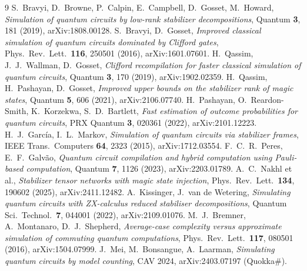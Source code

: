 \documentclass[11pt]{article}
\begin{document}
\begin{thebibliography}{9}
 S.~Bravyi, D.~Browne, P.~Calpin, E.~Campbell, D.~Gosset,
M.~Howard, \emph{Simulation of quantum circuits by low-rank stabilizer
decompositions}, Quantum \textbf{3}, 181 (2019), arXiv:1808.00128.
 S.~Bravyi, D.~Gosset, \emph{Improved classical simulation
of quantum circuits dominated by Clifford gates}, Phys.\ Rev.\ Lett.\
\textbf{116}, 250501 (2016), arXiv:1601.07601.
 H.~Qassim, J.~J.~Wallman, D.~Gosset, \emph{Clifford
recompilation for faster classical simulation of quantum circuits}, Quantum
\textbf{3}, 170 (2019), arXiv:1902.02359.
 H.~Qassim, H.~Pashayan, D.~Gosset, \emph{Improved upper
bounds on the stabilizer rank of magic states}, Quantum \textbf{5}, 606
(2021), arXiv:2106.07740.
 H.~Pashayan, O.~Reardon-Smith, K.~Korzekwa,
S.~D.~Bartlett, \emph{Fast estimation of outcome probabilities for quantum
circuits}, PRX Quantum \textbf{3}, 020361 (2022), arXiv:2101.12223.
\bibitem{garcia2015} H.~J.~Garc\'ia, I.~L.~Markov, \emph{Simulation of quantum
circuits via stabilizer frames}, IEEE Trans.\ Computers \textbf{64}, 2323
(2015), arXiv:1712.03554.
 F.~C.~R.~Peres, E.~F.~Galv\~ao, \emph{Quantum circuit
compilation and hybrid computation using Pauli-based computation}, Quantum
\textbf{7}, 1126 (2023), arXiv:2203.01789.
 A.~C.~Nakhl et al., \emph{Stabilizer tensor networks with
magic state injection}, Phys.\ Rev.\ Lett.\ \textbf{134}, 190602 (2025),
arXiv:2411.12482.
 A.~Kissinger, J.~van de Wetering, \emph{Simulating
quantum circuits with ZX-calculus reduced stabiliser decompositions}, Quantum
Sci.\ Technol.\ \textbf{7}, 044001 (2022), arXiv:2109.01076.
 M.~J.~Bremner, A.~Montanaro, D.~J.~Shepherd,
\emph{Average-case complexity versus approximate simulation of commuting
quantum computations}, Phys.\ Rev.\ Lett.\ \textbf{117}, 080501 (2016),
arXiv:1504.07999.
 J.~Mei, M.~Bonsangue, A.~Laarman, \emph{Simulating quantum
circuits by model counting}, CAV 2024, arXiv:2403.07197 (Quokka\#).
\end{thebibliography}
\end{document}
